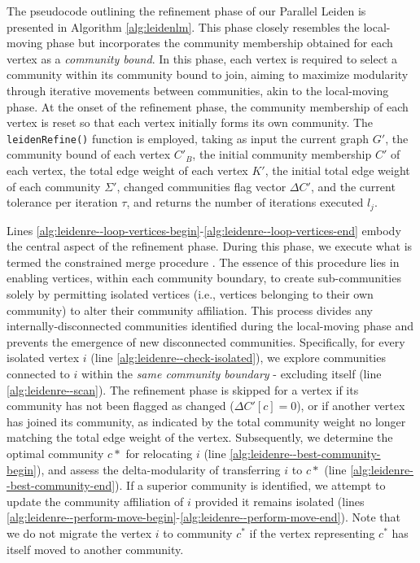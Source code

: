 The pseudocode outlining the refinement phase of our Parallel Leiden is presented in Algorithm \ref{alg:leidenlm}. This phase closely resembles the local-moving phase but incorporates the community membership obtained for each vertex as a \textit{community bound}. In this phase, each vertex is required to select a community within its community bound to join, aiming to maximize modularity through iterative movements between communities, akin to the local-moving phase. At the onset of the refinement phase, the community membership of each vertex is reset so that each vertex initially forms its own community. The \texttt{leidenRefine()} function is employed, taking as input the current graph $G'$, the community bound of each vertex $C'_B$, the initial community membership $C'$ of each vertex, the total edge weight of each vertex $K'$, the initial total edge weight of each community $\Sigma'$, changed communities flag vector $\Delta C'$, and the current tolerance per iteration $\tau$, and returns the number of iterations executed $l_j$.



Lines \ref{alg:leidenre--loop-vertices-begin}-\ref{alg:leidenre--loop-vertices-end} embody the central aspect of the refinement phase. During this phase, we execute what is termed the constrained merge procedure \cite{com-traag19}. The essence of this procedure lies in enabling vertices, within each community boundary, to create sub-communities solely by permitting isolated vertices (i.e., vertices belonging to their own community) to alter their community affiliation. This process divides any internally-disconnected communities identified during the local-moving phase and prevents the emergence of new disconnected communities. Specifically, for every isolated vertex $i$ (line \ref{alg:leidenre--check-isolated}), we explore communities connected to $i$ within the \textit{same community boundary} - excluding itself (line \ref{alg:leidenre--scan}). The refinement phase is skipped for a vertex if its community has not been flagged as changed ($\Delta C'[c] = 0$), or if another vertex has joined its community, as indicated by the total community weight no longer matching the total edge weight of the vertex. Subsequently, we determine the optimal community $c*$ for relocating $i$ (line \ref{alg:leidenre--best-community-begin}), and assess the delta-modularity of transferring $i$ to $c*$ (line \ref{alg:leidenre--best-community-end}). If a superior community is identified, we attempt to update the community affiliation of $i$ provided it remains isolated (lines \ref{alg:leidenre--perform-move-begin}-\ref{alg:leidenre--perform-move-end}). Note that we do not migrate the vertex $i$ to community $c^*$ if the vertex representing $c^*$ has itself moved to another community.



